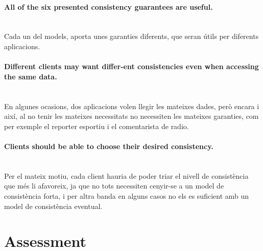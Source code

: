 \documentclass[a4paper, 10pt]{article}
\begin{document}
\paragraph{All of the six presented consistency guarantees are useful.\\\\}
Cada un del models, aporta unes garanties diferents, que seran útils per diferents aplicacions.
\paragraph{ Different clients may want differ-ent consistencies even when accessing
the same data.\\\\}

En algunes ocasions, dos aplicacions volen llegir les mateixes dades, però encara i així, al no tenir les mateixes necessitats no necessiten les mateixes garanties, com per exemple el reporter esportiu i el comentarista de radio.



\paragraph{Clients should be able to choose their desired consistency.\\\\}


Per el mateix motiu, cada client hauria de poder triar el nivell de consistència que més li afavoreix, ja que no tots necessiten cenyir-se a un model de consistència forta, i per altra banda en alguns casos no els es suficient amb un model de consistència eventual.

\section{Assessment}
\end{document}
